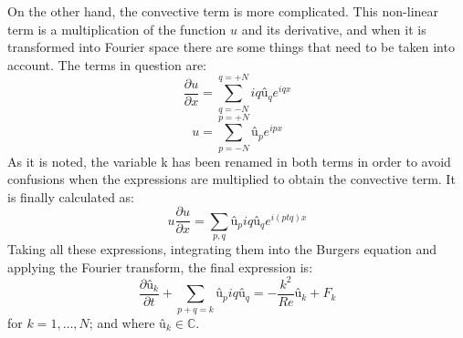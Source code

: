 On the other hand, the convective term is more complicated. This non-linear term is a multiplication of the function $u$ and its derivative, and when it is transformed into Fourier space there are some things that need to be taken into account. The terms in question are:
\begin{equation}
\frac{\partial u}{\partial x}=\sum_{q=-N}^{q=+N}iqû_{q}e^{iqx}
\end{equation}
\begin{equation}
u=\sum_{p=-N}^{p=+N}û_{p}e^{ipx}
\end{equation}
As it is noted, the variable k has been renamed in both terms in order to avoid confusions when the expressions are multiplied to obtain the convective term. It is finally calculated as:
\begin{equation}
u\frac{\partial u}{\partial x}=\sum_{p,q}û_{p}iqû_{q}e^{i\left(ptq\right)x}
\end{equation}
Taking all these expressions, integrating them into the Burgers equation and applying the Fourier transform, the final expression is:
\begin{equation}
\frac{\partial û_{k}}{\partial t}+\sum_{p+q=k}û_{p}iqû_{q}=-\frac{k^{2}}{Re}û_{k}+F_{k}
\end{equation}
for $k=1,\dots, N$; and where $û_{k}\in\mathbb{C}$.


